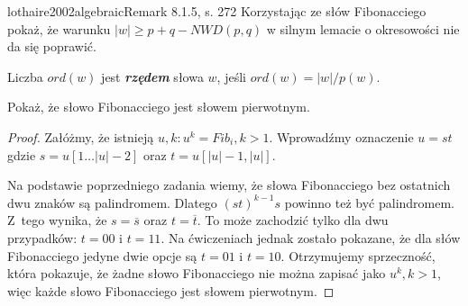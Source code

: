 \begin{problem}{lothaire2002algebraic}{Remark 8.1.5, s. 272}
  Korzystając ze słów Fibonacciego pokaż, że warunku $|w| \ge p + q - NWD(p, q)$ w silnym lemacie o okresowości nie da się poprawić.
\end{problem}

\begin{definition}{}{}
  Liczba $ord(w)$ jest \textbf{\textit{rzędem}} słowa $w$, jeśli $ord(w) = |w|/p(w)$.
\end{definition}

\begin{problem}{}{}
  Pokaż, że słowo Fibonacciego jest słowem pierwotnym.
\end{problem}

\begin{proof}
Załóżmy, że istnieją $u, k: u^k = Fib_i, k > 1$. Wprowadźmy oznaczenie $u = st$ gdzie $s = u[1\ldots|u|-2]$ oraz $t = u[|u|-1,|u|]$. 

Na podstawie poprzedniego zadania wiemy, że słowa Fibonacciego bez ostatnich dwu znaków są palindromem. Dlatego $(st)^{k-1}s$ powinno też być palindromem. Z~tego wynika, że $s = \overline{s}$ oraz $t = \overline{t}$. To może zachodzić tylko dla dwu przypadków: $t = 00$ i $t = 11$. Na ćwiczeniach jednak zostało pokazane, że dla słów Fibonacciego jedyne dwie opcje są $t = 01$ i $t = 10$. Otrzymujemy sprzeczność, która pokazuje, że żadne słowo Fibonacciego nie można zapisać jako $u^k, k > 1$, więc każde słowo Fibonacciego jest słowem pierwotnym.
\end{proof}
